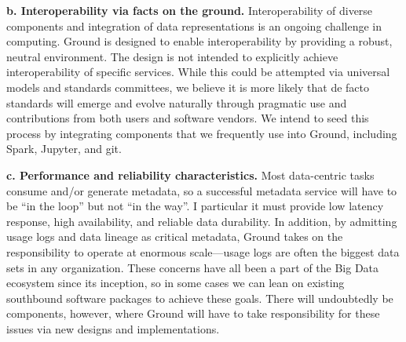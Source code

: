 \documentclass[10pt,letterpaper]{article}
\begin{document}
\vspace{0.5em}\noindent
\textbf{b. Interoperability via facts on the ground.}  
Interoperability of diverse components and integration of data representations is an ongoing challenge in computing. Ground is designed to enable interoperability by providing a robust, neutral environment. The design is not intended to explicitly achieve interoperability of specific services.  While this could be attempted via universal models and standards committees, we believe it is more likely that de facto standards will emerge and evolve naturally through pragmatic use and contributions from both users and software vendors.  We intend to seed this process by integrating components that we frequently use into Ground, including Spark, Jupyter, and git.


\vspace{0.5em}\noindent
\textbf{c. Performance and reliability characteristics.} Most data-centric tasks consume and/or generate metadata, so a successful metadata service will have to be ``in the loop'' but not ``in the way''.  I particular it must provide low latency response, high availability, and reliable data durability.  In addition, by admitting usage logs and data lineage as critical metadata, Ground takes on the responsibility to operate at enormous scale---usage logs are often the biggest data sets in any organization.
These concerns have all been a part of the Big Data ecosystem since its inception, so in some cases we can lean on existing southbound software packages to achieve these goals.  There will undoubtedly be components, however, where Ground will have to take responsibility for these issues via new designs and implementations.
\end{document}

